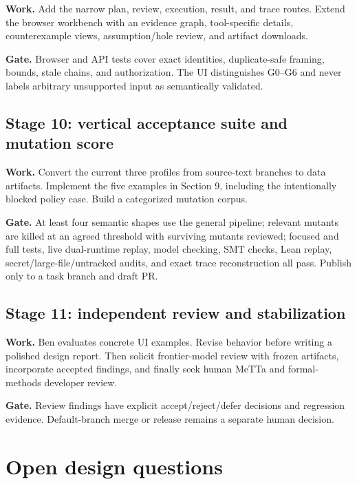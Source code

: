 \documentclass[10pt]{article}
\begin{document}
\textbf{Work.} Add the narrow plan, review, execution, result, and trace routes.
Extend the browser workbench with an evidence graph, tool-specific details,
counterexample views, assumption/hole review, and artifact downloads.

\textbf{Gate.} Browser and API tests cover exact identities, duplicate-safe
framing, bounds, stale chains, and authorization.  The UI distinguishes G0--G6
and never labels arbitrary unsupported input as semantically validated.

\subsection*{Stage 10: vertical acceptance suite and mutation score}

\textbf{Work.} Convert the current three profiles from source-text branches to
data artifacts.  Implement the five examples in Section 9, including the
intentionally blocked policy case.  Build a categorized mutation corpus.

\textbf{Gate.} At least four semantic shapes use the general pipeline; relevant
mutants are killed at an agreed threshold with surviving mutants reviewed;
focused and full tests, live dual-runtime replay, model checking, SMT checks,
Lean replay, secret/large-file/untracked audits, and exact trace reconstruction
all pass.  Publish only to a task branch and draft PR.

\subsection*{Stage 11: independent review and stabilization}

\textbf{Work.} Ben evaluates concrete UI examples.  Revise behavior before
writing a polished design report.  Then solicit frontier-model review with
frozen artifacts, incorporate accepted findings, and finally seek human MeTTa
and formal-methods developer review.

\textbf{Gate.} Review findings have explicit accept/reject/defer decisions and
regression evidence.  Default-branch merge or release remains a separate human
decision.

\section{Open design questions}
\end{document}
